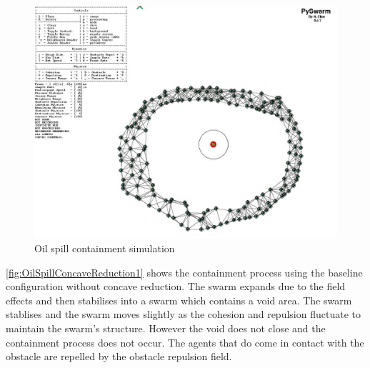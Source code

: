 \begin{figure}[H]
\begin{center}
\includegraphics[width=14cm]{CHAPTER-7/figures/OilSpillSimulator}
\end{center}
\caption{Oil spill containment simulation\label{concave:OilSpillSimulation}}
\end{figure}

\autoref{fig:OilSpillConcaveReduction1} shows the containment process using the baseline configuration without concave reduction. The swarm expands due to the field effects and then stabilises into a swarm which contains a void area. The swarm stablises and the swarm moves slightly as the cohesion and repulsion fluctuate to maintain the swarm's structure. However the void does not close and the containment process does not occur. The agents that do come in contact with the obstacle are repelled by the obstacle repulsion field.

